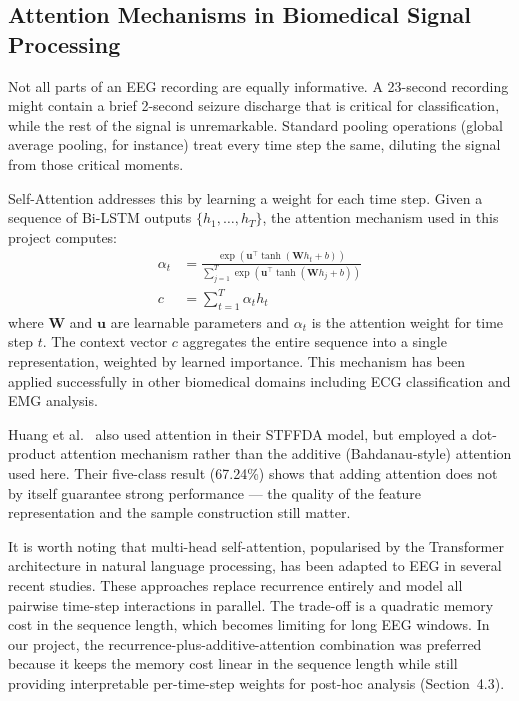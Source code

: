 \subsection{Attention Mechanisms in Biomedical Signal Processing}

Not all parts of an EEG recording are equally informative. A 23-second recording might contain a brief 2-second seizure discharge that is critical for classification, while the rest of the signal is unremarkable. Standard pooling operations (global average pooling, for instance) treat every time step the same, diluting the signal from those critical moments.

Self-Attention addresses this by learning a weight for each time step. Given a sequence of Bi-LSTM outputs $\{h_1, \ldots, h_T\}$, the attention mechanism used in this project computes:
\begin{equation}
\begin{aligned}
\alpha_t &= \frac{\exp(\mathbf{u}^\top \tanh(\mathbf{W} h_t + b))}{\sum_{j=1}^{T} \exp(\mathbf{u}^\top \tanh(\mathbf{W} h_j + b))} \\
c &= \sum_{t=1}^{T} \alpha_t h_t
\end{aligned}
\end{equation}
where $\mathbf{W}$ and $\mathbf{u}$ are learnable parameters and $\alpha_t$ is the attention weight for time step $t$. The context vector $c$ aggregates the entire sequence into a single representation, weighted by learned importance. This mechanism has been applied successfully in other biomedical domains including ECG classification and EMG analysis.

Huang et al.\ \cite{huang2025} also used attention in their STFFDA model, but employed a dot-product attention mechanism rather than the additive (Bahdanau-style) attention used here. Their five-class result (67.24\%) shows that adding attention does not by itself guarantee strong performance --- the quality of the feature representation and the sample construction still matter.

It is worth noting that multi-head self-attention, popularised by the Transformer architecture in natural language processing, has been adapted to EEG in several recent studies. These approaches replace recurrence entirely and model all pairwise time-step interactions in parallel. The trade-off is a quadratic memory cost in the sequence length, which becomes limiting for long EEG windows. In our project, the recurrence-plus-additive-attention combination was preferred because it keeps the memory cost linear in the sequence length while still providing interpretable per-time-step weights for post-hoc analysis (Section~4.3).

